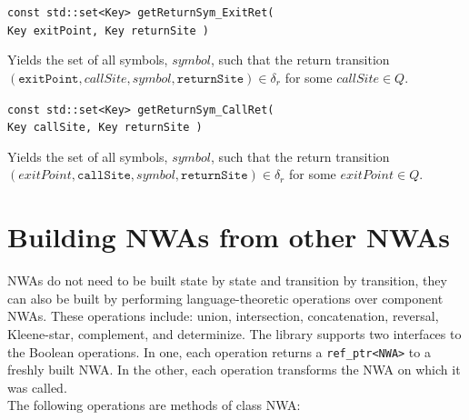 \documentclass{llncs}
\begin{document}
\begin{description}
  \item\texttt{const std::set<Key> getReturnSym\_ExitRet( \\ \hspace*{3.25cm} Key exitPoint, Key returnSite )}

    Yields the set of all symbols, $symbol$, such that the return transition $(\texttt{exitPoint},callSite,symbol,\texttt{returnSite}) \in \delta_r$ for some $callSite \in Q$.

  \item\texttt{const std::set<Key> getReturnSym\_CallRet( \\ \hspace*{3.25cm} Key callSite, Key returnSite )}

    Yields the set of all symbols, $symbol$, such that the return transition $(exitPoint,\texttt{callSite},symbol,\texttt{returnSite}) \in \delta_r$ for some $exitPoint \in Q$. \\

\end{description}

\section{Building NWAs from other NWAs}
\label{Se:Building NWAs}

NWAs do not need to be built state by state and transition by transition, they can also be built by performing language-theoretic operations over component NWAs. These operations include: union, intersection, concatenation, reversal, Kleene-star, complement, and determinize. The library supports two interfaces to the Boolean operations.  In one, each operation returns a \texttt{ref\_ptr<NWA>} to a freshly built NWA.  In the other, each operation transforms the NWA on which it was called. \\

\noindent The following operations are methods of class NWA:
\end{document}
